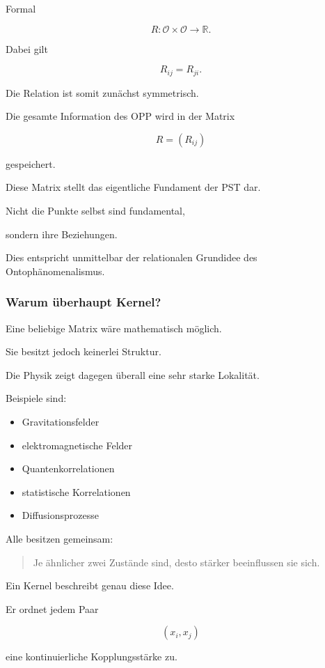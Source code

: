 Formal

\[
R :
\mathcal O \times \mathcal O
\longrightarrow
\mathbb R .
\]

Dabei gilt

\[
R_{ij}=R_{ji}.
\]

Die Relation ist somit zunächst symmetrisch.

Die gesamte Information des OPP wird in der Matrix

\[
R=
(R_{ij})
\]

gespeichert.

Diese Matrix stellt das eigentliche Fundament der PST dar.

Nicht die Punkte selbst sind fundamental,

sondern ihre Beziehungen.

Dies entspricht unmittelbar der relationalen Grundidee des
Ontophänomenalismus.

\bigskip

\subsubsection{Warum überhaupt Kernel?}

Eine beliebige Matrix wäre mathematisch möglich.

Sie besitzt jedoch keinerlei Struktur.

Die Physik zeigt dagegen überall eine sehr starke Lokalität.

Beispiele sind:

\begin{itemize}
\item Gravitationsfelder
\item elektromagnetische Felder
\item Quantenkorrelationen
\item statistische Korrelationen
\item Diffusionsprozesse
\end{itemize}

Alle besitzen gemeinsam:

\begin{quote}
Je ähnlicher zwei Zustände sind,
desto stärker beeinflussen sie sich.
\end{quote}

Ein Kernel beschreibt genau diese Idee.

Er ordnet jedem Paar

\[
(x_i,x_j)
\]

eine kontinuierliche Kopplungsstärke zu.

